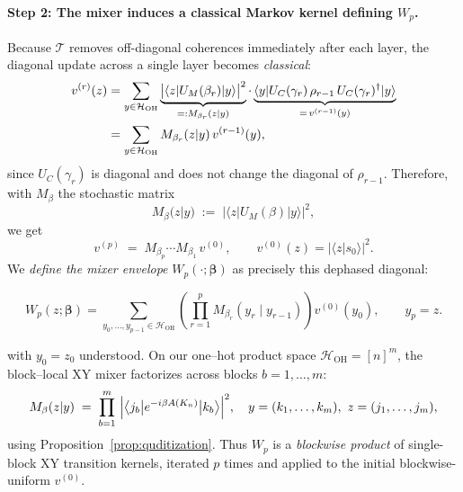 \documentclass[a4paper,unpublished,onecolumn,11pt]{quantumarticle}
\theoremstyle{definition}
\theoremstyle{remark}
\newcommand{\OH}{\mathcal{H}_{\mathrm{OH}}}
\begin{document}
\paragraph{Step 2: The mixer induces a classical Markov kernel defining \(W_p\).}
Because \(\mathcal T\) removes off-diagonal coherences immediately after each layer,
the diagonal update across a single layer becomes \emph{classical}:
\begin{align}
  v^{(r)}(z)
  &= \sum_{y\in\OH} \underbrace{\bigl|\langle z|U_M(\beta_r)|y\rangle\bigr|^2}_{=:M_{\beta_r}(z|y)}
     \cdot \underbrace{\langle y|U_C(\gamma_r)\,\rho_{r-1}\,U_C(\gamma_r)^\dagger|y\rangle}_{=\,v^{(r-1)}(y)}
  \notag\\
  &= \sum_{y\in\OH} M_{\beta_r}(z|y)\,v^{(r-1)}(y),
\end{align}
since \(U_C(\gamma_r)\) is diagonal and does not change the diagonal of \(\rho_{r-1}\).
Therefore, with \(M_{\beta}\) the stochastic matrix
\[
  M_{\beta}(z|y)\;:=\;\bigl|\langle z|U_M(\beta)|y\rangle\bigr|^2,
\]
we get
\begin{equation}
  \label{eq:Wp-def}
  v^{(p)} \;=\; M_{\beta_p}\cdots M_{\beta_1}\,v^{(0)},
  \qquad
  v^{(0)}(z)=|\langle z|s_0\rangle|^2.
\end{equation}
We \emph{define the mixer envelope} \(W_p(\cdot;\boldsymbol\beta)\) as precisely this dephased diagonal:

\[
W_p(z;\boldsymbol\beta)
=
\sum_{y_0,\ldots,y_{p-1}\in\OH}
\left(
\prod_{r=1}^{p}
M_{\beta_r}(y_r\mid y_{r-1})
\right)
v^{(0)}(y_0),
\qquad y_p=z.
\]


with \(y_0=z_0\) understood. On our one–hot product space \(\OH=[n]^m\),
the block–local XY mixer factorizes across blocks \(b=1,\dots,m\):
\begin{equation}
  M_{\beta}(z|y)
  \;=\;
  \prod_{b=1}^{m}\ \Bigl|\bigl\langle j_b\big|e^{-i\beta A(K_n)}\big|k_b\bigr\rangle\Bigr|^2,
  \quad
  y=(k_1,\dots,k_m),\ z=(j_1,\dots,j_m),
\end{equation}
using Proposition~\ref{prop:quditization}. Thus \(W_p\) is a \emph{blockwise product} of single-block XY transition kernels, iterated \(p\) times and applied to the initial blockwise-uniform \(v^{(0)}\).
\end{document}
